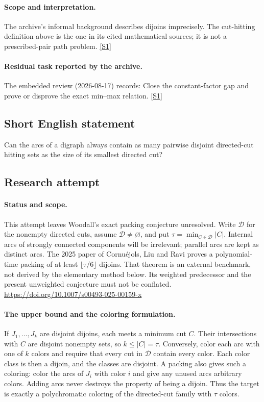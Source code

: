 \documentclass[11pt,a4paper]{article}
\newcommand{\sref}[2]{\hyperlink{source:#1:#2}{[S#2]}}
\begin{document}
\paragraph{Scope and interpretation.}

The archive’s informal background describes dijoins imprecisely. The cut-hitting definition above is the one in its cited mathematical sources; it is not a prescribed-pair path problem. \sref{1445}{1}

\paragraph{Residual task reported by the archive.}

The embedded review (2026-08-17) records: Close the constant-factor gap and prove or disprove the exact min--max relation. \sref{1445}{1}

\subsection{Short English statement}

Can the arcs of a digraph always contain as many pairwise disjoint directed-cut hitting sets as the size of its smallest directed cut?

\subsection{Research attempt}
\paragraph{Status and scope.}
This attempt leaves Woodall's exact packing conjecture unresolved.
Write $\mathcal D$ for the nonempty directed cuts, assume
$\mathcal D\ne\varnothing$, and put
$\tau=\min_{C\in\mathcal D}|C|$. Internal arcs of strongly connected
components will be irrelevant; parallel arcs are kept as distinct arcs.
The 2025 paper of Cornu\'ejols, Liu and Ravi proves a polynomial-time
packing of at least $\lfloor\tau/6\rfloor$ dijoins. That theorem is an
external benchmark, not derived by the elementary method below.
Its weighted predecessor and the present unweighted conjecture must not
be conflated. \url{https://doi.org/10.1007/s00493-025-00159-x}

\paragraph{The upper bound and the coloring formulation.}
If $J_1,\ldots,J_k$ are disjoint dijoins, each meets a minimum cut $C$.
Their intersections with $C$ are disjoint nonempty sets, so $k\leq|C|=\tau$.
Conversely, color each arc with one of $k$ colors and require that every
cut in $\mathcal D$ contain every color. Each color class is then a
dijoin, and the classes are disjoint. A packing also gives such a
coloring: color the arcs of $J_i$ with color $i$ and give any unused
arcs arbitrary colors. Adding arcs never destroys the property of
being a dijoin. Thus the target is exactly a polychromatic coloring
of the directed-cut family with $\tau$ colors.
\end{document}
